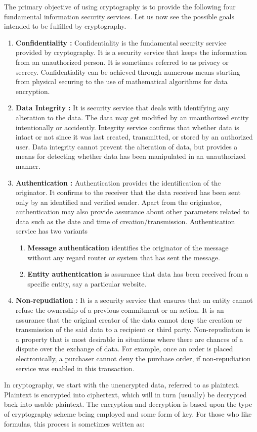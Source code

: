 \documentclass[british]{article}
\begin{document}
The primary objective of using cryptography is to provide the following
four fundamental information security services. Let us now see the
possible goals intended to be fulfilled by cryptography.
\begin{enumerate}
\item \textbf{Confidentiality : }Confidentiality is the fundamental security
service provided by cryptography. It is a security service that keeps
the information from an unauthorized person. It is sometimes referred
to as privacy or secrecy. Confidentiality can be achieved through
numerous means starting from physical securing to the use of mathematical
algorithms for data encryption.
\item \textbf{Data Integrity :} It is security service that deals with identifying
any alteration to the data. The data may get modified by an unauthorized
entity intentionally or accidently. Integrity service confirms that
whether data is intact or not since it was last created, transmitted,
or stored by an authorized user. Data integrity cannot prevent the
alteration of data, but provides a means for detecting whether data
has been manipulated in an unauthorized manner.
\item \textbf{Authentication : }Authentication provides the identification
of the originator. It confirms to the receiver that the data received
has been sent only by an identified and verified sender. Apart from
the originator, authentication may also provide assurance about other
parameters related to data such as the date and time of creation/transmission.
Authentication service has two variants \textminus{}
\begin{enumerate}
\item \textbf{Message authentication} identifies the originator of the message
without any regard router or system that has sent the message.
\item \textbf{Entity authentication} is assurance that data has been received
from a specific entity, say a particular website.
\end{enumerate}
\item \textbf{Non-repudiation : }It is a security service that ensures that
an entity cannot refuse the ownership of a previous commitment or
an action. It is an assurance that the original creator of the data
cannot deny the creation or transmission of the said data to a recipient
or third party. Non-repudiation is a property that is most desirable
in situations where there are chances of a dispute over the exchange
of data. For example, once an order is placed electronically, a purchaser
cannot deny the purchase order, if non-repudiation service was enabled
in this transaction.
\end{enumerate}
In cryptography, we start with the unencrypted data, referred to as
plaintext. Plaintext is encrypted into ciphertext, which will in turn
(usually) be decrypted back into usable plaintext. The encryption
and decryption is based upon the type of cryptography scheme being
employed and some form of key. For those who like formulas, this process
is sometimes written as:
\end{document}

